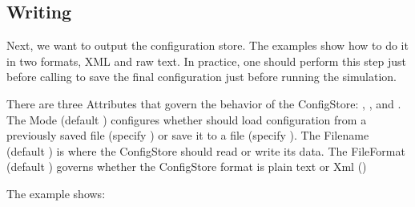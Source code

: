 \documentclass[letterpaper,10pt,english]{sphinxmanual}
\renewcommand{\sphinxcode}[1]{\texttt{\small{#1}}}
\begin{document}
\begin{sphinxVerbatim}[commandchars=\\\{\}]
 
\end{sphinxVerbatim}


\subsection{Writing}
\label{\detokenize{attributes:writing}}
Next, we want to output the configuration store.  The examples show how
to do it in two formats, XML and raw text.  In practice, one should perform
this step just before calling \sphinxcode{} to save the
final configuration just before running the simulation.

There are three Attributes that govern the behavior of the ConfigStore:
\sphinxcode{}, \sphinxcode{}, and \sphinxcode{}.  The Mode (default \sphinxcode{})
configures whether  should load configuration from a previously saved file
(specify \sphinxcode{}) or save it to a file (specify \sphinxcode{}).
The Filename (default \sphinxcode{}) is where the ConfigStore should read or write
its data.  The FileFormat (default \sphinxcode{}) governs whether
the ConfigStore format is plain text or Xml (\sphinxcode{})

The example shows:
\end{document}
